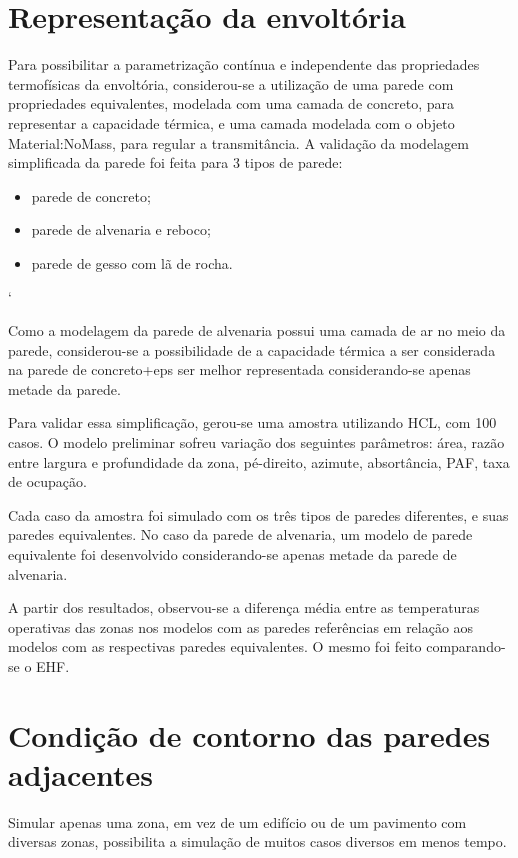 \documentclass[brazil,hardcopy,openany,a5paper]{ufscthesis}
\begin{document}
		\section{Representação da envoltória}
		
		Para possibilitar a parametrização contínua e independente das propriedades termofísicas da envoltória, considerou-se a utilização de uma parede com propriedades equivalentes, modelada com uma camada de concreto, para representar a capacidade térmica, e uma camada modelada com o objeto Material:NoMass, para regular a transmitância.
		A validação da modelagem simplificada da parede foi feita para 3 tipos de parede:
		
		\begin{itemize}
			\item parede de concreto;
			\item parede de alvenaria e reboco;
			\item parede de gesso com lã de rocha.
		\end{itemize}`
		
		Como a modelagem da parede de alvenaria possui uma camada de ar no meio da parede, considerou-se a possibilidade de a capacidade térmica a ser considerada na parede de concreto+eps ser melhor representada considerando-se apenas metade da parede.
		
		Para validar essa simplificação, gerou-se uma amostra utilizando HCL, com 100 casos. O modelo preliminar sofreu variação dos seguintes parâmetros: área, razão entre largura e profundidade da zona, pé-direito, azimute, absortância, PAF, taxa de ocupação.
		
		Cada caso da amostra foi simulado com os três tipos de paredes diferentes, e suas paredes equivalentes. No caso da parede de alvenaria, um modelo de parede equivalente foi desenvolvido considerando-se apenas metade da parede de alvenaria.
		
		A partir dos resultados, observou-se a diferença média entre as temperaturas operativas das zonas nos modelos com as paredes referências em relação aos modelos com as respectivas paredes equivalentes. O mesmo foi feito comparando-se o EHF.
		
		\section{Condição de contorno das paredes adjacentes}
		
		Simular apenas uma zona, em vez de um edifício ou de um pavimento com diversas zonas, possibilita a simulação de muitos casos diversos em menos tempo.
		
\end{document}
